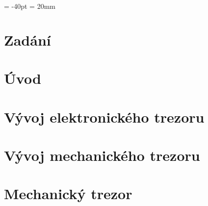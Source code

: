 \documentclass{template/DMP}
\renewcommand{\headrulewidth}{ 0PT }
\begin{document}
{\tableofcontents %

\voffset = -40pt
\headsep = 20mm

\newpage

\setcounter{figure}{0}
\setcounter{table}{0}

\pagestyle{empty}
\pagestyle{plain}



\chapter{Zadání}


\chapter{Úvod}


\chapter{Vývoj elektronického trezoru}
\label{E-vyvoj}






\chapter{Vývoj mechanického trezoru}
\label{M-vyvoj}





\chapter{Mechanický trezor} 
\label{M3}

}
\end{document}
